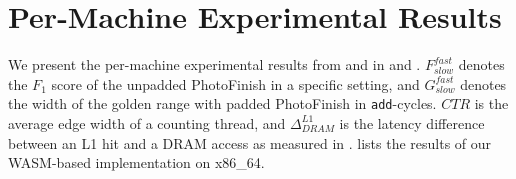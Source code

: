\documentclass[letterpaper,twocolumn,10pt]{article} %
\newcommand{\AttackName}{PhotoFinish\xspace}
\begin{document}
\FloatBarrier



\newpage

\appendix
{}
\FloatBarrier

\section{Per-Machine Experimental Results}\label{sec:precision-analysis}
We present the per-machine experimental results from  and  in  and .
$F^{fast}_{slow}$ denotes the $F_1$ score of the unpadded \AttackName in a specific setting, and $G^{fast}_{slow}$ denotes the width of the golden range with padded \AttackName in \texttt{add}-cycles.
$CTR$ is the average edge width of a counting thread, and $\Delta^{L1}_{DRAM}$ is the latency difference between an L1 hit and a DRAM access as measured in .
 lists the results of our WASM-based implementation on x86\_64.
\end{document}
